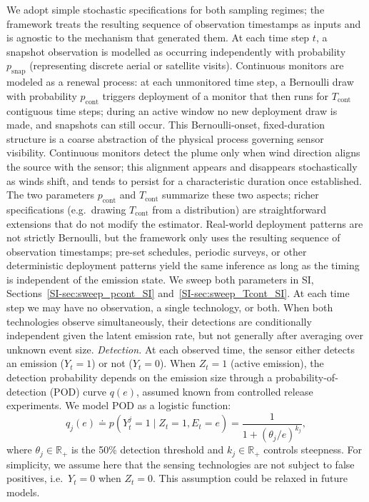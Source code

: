 \documentclass[numsec,webpdf,modern,mediumone]{oup-authoring-template}
\newcommand{\new}[1]{#1}
\begin{document}
\new{We adopt simple stochastic specifications for both sampling regimes; the framework treats the resulting sequence of observation timestamps as inputs and is agnostic to the mechanism that generated them.} At each time step $t$, a snapshot observation is modelled as occurring independently with probability $p_{\text{snap}}$ (representing discrete aerial or satellite visits). Continuous monitors are modeled as a renewal process: at each unmonitored time step, a Bernoulli draw with probability $p_{\text{cont}}$ triggers deployment of a monitor that then runs for $T_{\text{cont}}$ contiguous time steps; during an active window no new deployment draw is made, and snapshots can still occur. \new{This Bernoulli-onset, fixed-duration structure is a coarse abstraction of the physical process governing sensor visibility. Continuous monitors detect the plume only when wind direction aligns the source with the sensor; this alignment appears and disappears stochastically as winds shift, and tends to persist for a characteristic duration once established. The two parameters $p_{\text{cont}}$ and $T_{\text{cont}}$ summarize these two aspects; richer specifications (e.g.\ drawing $T_{\text{cont}}$ from a distribution) are straightforward extensions that do not modify the estimator. Real-world deployment patterns are not strictly Bernoulli, but the framework only uses the resulting sequence of observation timestamps; pre-set schedules, periodic surveys, or other deterministic deployment patterns yield the same inference as long as the timing is independent of the emission state. We sweep both parameters in SI, Sections~\ref{SI-sec:sweep_pcont_SI} and~\ref{SI-sec:sweep_Tcont_SI}.} At each time step we may have no observation, a single technology, or both. When both technologies observe simultaneously, their detections are conditionally independent given the latent emission rate, but not generally after averaging over unknown event size.
\textit{Detection.} At each observed time, the sensor either detects an emission ($Y_t = 1$) or not ($Y_t = 0$). When $Z_t=1$ (active emission), the detection probability depends on the emission size through a probability-of-detection (POD) curve $q(e)$, assumed known from controlled release experiments. We model POD as a logistic function:
\begin{equation}
    q_j(e)
    \doteq p(Y^j_t=1\mid Z_t=1,E_t=e)
    = \frac{1}{1+(\theta_j/e)^{k_j}},
    \label{eq:pod}
\end{equation}
where $\theta_j \in\mathbb{R}_+$ is the 50\% detection threshold and $k_j\in\mathbb{R}_+$ controls steepness. For simplicity, we assume here that the sensing technologies are not subject to false positives, i.e.\ $Y_t=0$ when $Z_t=0$. This assumption could be relaxed in future models.
\end{document}
